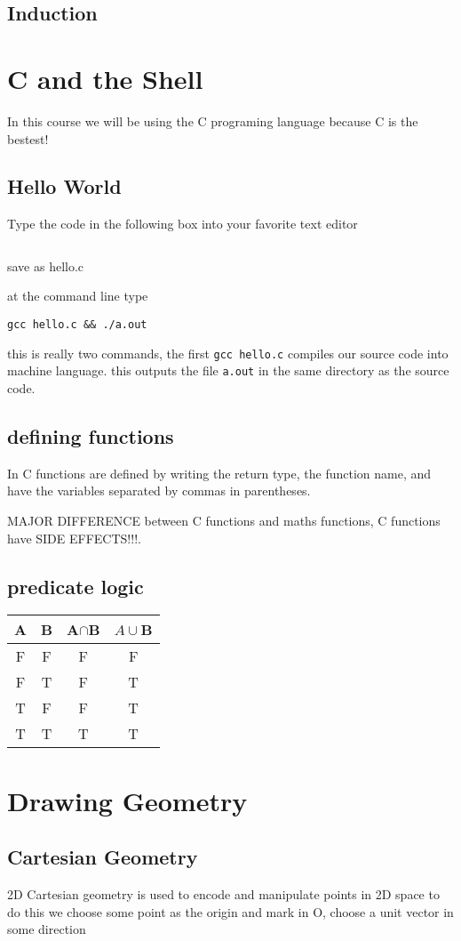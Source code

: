 \documentclass[12pt]{article}
\begin{document}
\subsection{Induction}

\section{C and the Shell}
    In this course we will be using the C programing language because C is the bestest!
\subsection{Hello World}
    Type the code in the following box into your favorite text editor
\inputminted{c}{hello.c}
    save as hello.c

    at the command line type

    \texttt{gcc hello.c \&\& ./a.out}

    this is really two commands, the first \texttt{gcc hello.c} compiles our source code into
    machine language. this outputs the file \texttt{a.out} in the same directory as the 
    source code.
\subsection{defining functions}
    In C functions are defined by writing the return type, the function name, and have 
    the variables separated by commas in parentheses.

    MAJOR DIFFERENCE between C functions and maths functions, C functions have SIDE EFFECTS!!!.
\subsection{predicate logic}
    \begin{tabular}{| c  c|| c c |}
        A & B & A$\cap$B & $A\cup$B\\
        \hline
        F & F & F & F     \\
        F & T & F & T     \\
        T & F & F & T     \\
        T & T & T & T     \\
    \end{tabular}

\section{Drawing Geometry}
\subsection{Cartesian Geometry}
    2D Cartesian geometry is used to encode and manipulate points in 2D space
    to do this we choose some point as the origin and mark in O, choose a unit 
    vector in some direction 
\end{document}
